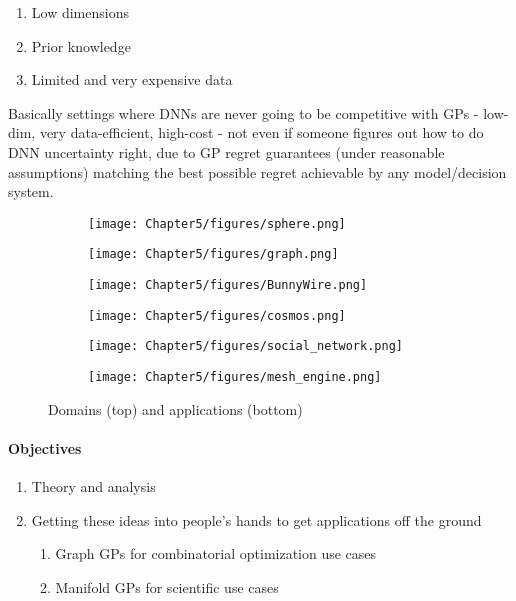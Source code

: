 \begin{enumerate}
    \item Low dimensions
    \item Prior knowledge
    \item Limited and very expensive data
\end{enumerate}

Basically settings where DNNs are never going to be competitive with GPs - low-dim, very data-efficient, high-cost - not even if someone figures out how to do DNN uncertainty right, due to GP regret guarantees (under reasonable assumptions) matching the best possible regret achievable by any model/decision system.

\begin{figure}[htb]
    \centering %
\begin{subfigure}{0.25\textwidth}
  \texttt{[image: Chapter5/figures/sphere.png]}
  \label{fig:1}
\end{subfigure}\hfil %
\begin{subfigure}{0.25\textwidth}
  \texttt{[image: Chapter5/figures/graph.png]}
  \label{fig:2}
\end{subfigure}\hfil %
\begin{subfigure}{0.25\textwidth}
  \texttt{[image: Chapter5/figures/BunnyWire.png]}
  \label{fig:3}
\end{subfigure}

\medskip
\begin{subfigure}{0.25\textwidth}
  \texttt{[image: Chapter5/figures/cosmos.png]}
  \label{fig:4}
\end{subfigure}\hfil %
\begin{subfigure}{0.25\textwidth}
  \texttt{[image: Chapter5/figures/social\_network.png]}
  \label{fig:5}
\end{subfigure}\hfil %
\begin{subfigure}{0.25\textwidth}
  \texttt{[image: Chapter5/figures/mesh\_engine.png]}
  \label{fig:6}
\end{subfigure}
\caption{Domains (top) and applications (bottom)}
\label{fig:images}
\end{figure}

\paragraph{Objectives}
\begin{enumerate}
    \item Theory and analysis
    \item Getting these ideas into people's hands to get applications off the ground
    \begin{enumerate}
        \item Graph GPs for combinatorial optimization use cases
        \item Manifold GPs for scientific use cases
    \end{enumerate}
\end{enumerate}

